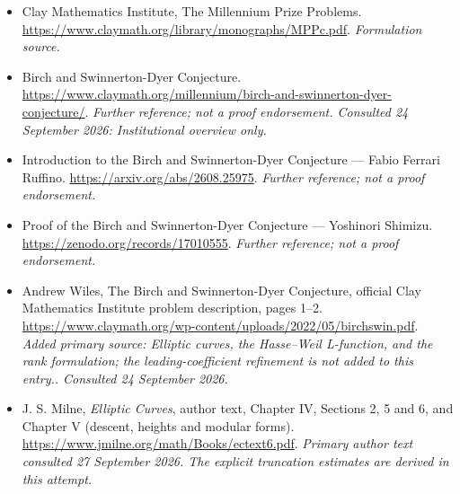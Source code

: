 \documentclass[11pt]{article}
\begin{document}
\begin{itemize}
\item[S1]\hypertarget{source:S1}{}Clay Mathematics Institute, The Millennium Prize Problems.
\url{https://www.claymath.org/library/monographs/MPPc.pdf}.
\textit{Formulation source.}
\item[S2]\hypertarget{source:S2}{}Birch and Swinnerton-Dyer Conjecture.
\url{https://www.claymath.org/millennium/birch-and-swinnerton-dyer-conjecture/}.
\textit{Further reference; not a proof endorsement. Consulted 24 September 2026: Institutional overview only.}
\item[S3]\hypertarget{source:S3}{}Introduction to the Birch and Swinnerton-Dyer Conjecture — Fabio Ferrari Ruffino.
\url{https://arxiv.org/abs/2608.25975}.
\textit{Further reference; not a proof endorsement.}
\item[S4]\hypertarget{source:S4}{}Proof of the Birch and Swinnerton-Dyer Conjecture — Yoshinori Shimizu.
\url{https://zenodo.org/records/17010555}.
\textit{Further reference; not a proof endorsement.}
\item[E1]\hypertarget{source:E1}{}Andrew Wiles, The Birch and Swinnerton-Dyer Conjecture, official Clay Mathematics Institute problem description, pages 1–2.
\url{https://www.claymath.org/wp-content/uploads/2022/05/birchswin.pdf}.
\textit{Added primary source: Elliptic curves, the Hasse–Weil L-function, and the rank formulation; the leading-coefficient refinement is not added to this entry.. Consulted 24 September 2026.}
\item[E2]\hypertarget{source:E2}{}J. S. Milne, \emph{Elliptic Curves}, author text, Chapter IV, Sections 2, 5 and 6, and Chapter V (descent, heights and modular forms).
\url{https://www.jmilne.org/math/Books/ectext6.pdf}.
\textit{Primary author text consulted 27 September 2026. The explicit truncation estimates are derived in this attempt.}
\end{itemize}
\end{document}
